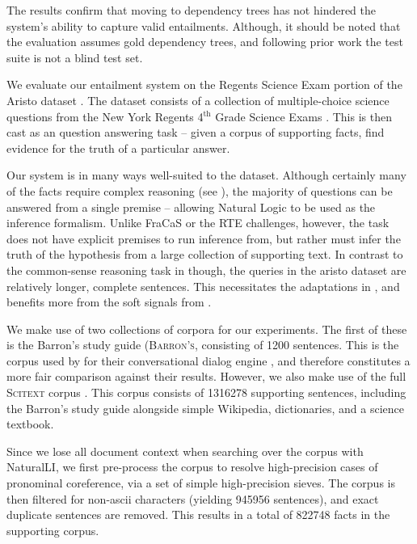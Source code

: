 The results confirm that moving to dependency trees has not hindered the
  system's ability to capture valid entailments.
Although, it should be noted that the evaluation assumes gold dependency
  trees, and following prior work the test suite is not a blind test
  set.

%
%
We evaluate our entailment system on the Regents Science Exam portion of
  the Aristo dataset \cite{key:2013clark-aristo,key:2015clark-aristo}.
The dataset consists of a collection of multiple-choice science questions
  from the New York Regents 4$^{\textrm{th}}$ Grade Science Exams
  \cite{key:NYSED}.
This is then cast as an question answering task -- given a corpus of
  supporting facts, find evidence for the truth of a particular answer.

Our system is in many ways well-suited to the dataset.
Although certainly many of the facts require complex reasoning
  (see ), the majority of questions can be
  answered from a single premise -- allowing Natural Logic to be used
  as the inference formalism.
Unlike FraCaS or the RTE challenges, however, the task does not have explicit
  premises to run inference from, but rather must infer the truth of the
  hypothesis from a large collection of supporting text.
In contrast to the common-sense reasoning task in 
  though, the queries in the aristo dataset are relatively longer, complete sentences.
This necessitates the adaptations in , and benefits more from the
  soft signals from .

We make use of two collections of corpora for our experiments.
The first of these is the Barron's study guide (\textsc{Barron's}, 
  consisting of \num{1200} sentences.
This is the corpus used by  for their conversational
  dialog engine \knowbot, and therefore constitutes a more fair comparison against 
  their results.
However, we also make use of the full \textsc{Scitext} corpus \cite{key:2014clark-aristo}.
This corpus consists of \num{1316278} supporting sentences, 
  including the Barron's study guide alongside 
  simple Wikipedia, dictionaries, and a science textbook.

Since we lose all document context when searching over the corpus with NaturalLI,
  we first pre-process the corpus to resolve high-precision cases of
  pronominal coreference, via a set of simple high-precision sieves.
The corpus is then filtered for non-ascii characters (yielding \num{945956} sentences),
  and exact duplicate sentences are removed.
This results in a total of \num{822748} facts in the supporting corpus.

